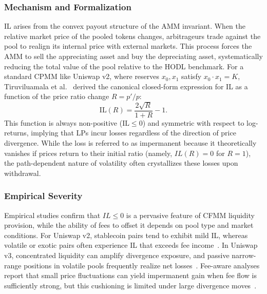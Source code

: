 \documentclass[anonymous]{lipics-v2021}
\begin{document}
\subsubsection{Mechanism and Formalization}
IL arises from the convex payout structure of the AMM invariant. When the relative market price of the pooled tokens changes, arbitrageurs trade against the pool to realign its internal price with external markets. This process forces the AMM to sell the appreciating asset and buy the depreciating asset, systematically reducing the total value of the pool relative to the HODL benchmark.
For a standard CPMM like Uniswap v2, where reserves $x_0, x_1$ satisfy $x_0 \cdot x_1 = K$, Tiruviluamala et al.~\cite{tiruviluamala2022general} derived the canonical closed-form expression for IL as a function of the price ratio change $R = p'/p$:
\begin{equation}
    \mathrm{IL}(R) = \frac{2\sqrt{R}}{1+R} - 1.
    \label{eq:il_canonical}
\end{equation}
This function is always non-positive ($\mathrm{IL} \le 0$) and symmetric with respect to log-returns, implying that LPs incur losses regardless of the direction of price divergence. While the loss is referred to as impermanent because it theoretically vanishes if prices return to their initial ratio (namely, $IL(R)=0$ for $R=1$), the path-dependent nature of volatility often crystallizes these losses upon withdrawal.

\subsubsection{Empirical Severity}
Empirical studies confirm that $IL \le 0$ is a pervasive feature of CFMM liquidity provision, while the ability of fees to offset it depends on pool type and market conditions. 
For Uniswap v2, stablecoin pairs tend to exhibit mild IL, whereas volatile or exotic pairs often experience IL that exceeds fee income~\cite{heimbach2021behavior, boueri2021g3m}. 
In Uniswap v3, concentrated liquidity can amplify divergence exposure, and passive narrow-range positions in volatile pools frequently realize net losses~\cite{heimbach2022risks}. 
Fee-aware analyses report that small price fluctuations can yield impermanent gain when fee flow is sufficiently strong, but this cushioning is limited under large divergence moves~\cite{roman2025impact}.
\end{document}
